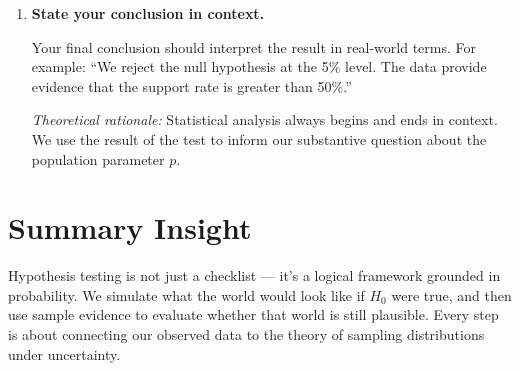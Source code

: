 \documentclass[11pt]{article}
\begin{document}
\begin{enumerate}[label=\textbf{Step \arabic*:}, leftmargin=2.5em]
\vspace{0.5em}
\item \textbf{State your conclusion in context.}

Your final conclusion should interpret the result in real-world terms. For example: ``We reject the null hypothesis at the 5\% level. The data provide evidence that the support rate is greater than 50\%.''

\textit{Theoretical rationale:} Statistical analysis always begins and ends in context. We use the result of the test to inform our substantive question about the population parameter $p$.

\end{enumerate}

\vspace{1em}
\section*{Summary Insight}

Hypothesis testing is not just a checklist — it's a logical framework grounded in probability. We simulate what the world would look like if $H_0$ were true, and then use sample evidence to evaluate whether that world is still plausible. Every step is about connecting our observed data to the theory of sampling distributions under uncertainty.
\end{document}
